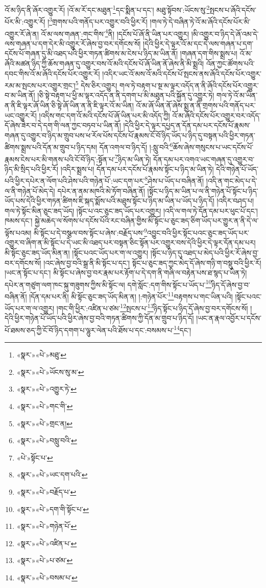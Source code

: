 འོ་མ་ཉིད་ནི་ཞོར་འགྱུར་རོ། །འོ་མ་རོ་དང་མཐུན་\footnote{«སྣར་»«པེ་»མཐུ་}དང་སྨིན་པ་དང་། མཐུ་སྟོབས་:ཡོངས་སུ་\footnote{«སྣར་»«པེ་»ཡོངས་སུ་མ་}སྤངས་པ་ཞོའི་དངོས་པོར་མི་:འགྱུར་རོ། །\footnote{«སྣར་»«པེ་»འགྱུར་ཏེ་}གྲགས་པའི་གནོད་པར་འགྱུར་བའི་ཕྱིར་རོ། །གལ་ཏེ་དེ་བཞིན་ཏེ་འོ་མ་ཞོའི་དངོས་པོར་མི་འགྱུར་རོ་ཞེ་ན། འོ་མ་ལས་གཞན་:གང་གིས་\footnote{«སྣར་»«པེ་»གང་གི་}ནི། །དངོས་པོ་ཞོ་ནི་ཡིན་པར་འགྱུར། །མི་འགྱུར་བ་ཉིད་དེ་ཞོ་འམ་དེ་ལས་གཞན་པ་དག་དེར་མི་འགྱུར་རོ་ཞེས་བྱ་བར་དགོངས་སོ། །དེའི་ཕྱིར་དེ་ལྟར་འོ་མ་དང་དེ་ལས་གཞན་པ་དག་དངོས་པོ་གཞན་དུ་མི་འཐད་པའི་ཕྱིར་གཏན་ཚིགས་མ་ངེས་པ་ཉིད་མ་ཡིན་ནོ། །གཞན་དག་གིས་སྨྲས་པ། འོ་མ་ཞོའི་མཚན་ཉིད་ཀྱི་ཆོས་གཞན་དུ་འགྱུར་བས་འོ་མའི་དངོས་པོ་ཞོ་ཡིན་ནོ་ཞེས་ནི་མི་སྨྲའི། འོན་ཀྱང་ཚོགས་པའི་དབང་གིས་འོ་མ་ཞོའི་དངོས་པོར་འགྱུར་རོ། །འདིར་ཡང་འོ་མས་འོ་མའི་དངོས་པོ་སྤངས་ནས་ཞོའི་དངོས་པོར་འགྱུར་རམ་མ་སྤངས་པར་འགྱུར་གྲང་།\footnote{«སྣར་»«པེ་»གྲང་ན།} དེས་ཅིར་འགྱུར། གལ་ཏེ་བརྟག་པ་སྔ་མ་ལྟར་འདོད་ན་ནི་ཞོའི་དངོས་པོར་འགྱུར་བ་མ་ཡིན་ནོ། །ཅི་སྟེ་བརྟག་པ་ཕྱི་མ་ལྟར་འདོད་ན་ནི་དགག་པ་མི་མཐུན་པའི་སྐྱོན་དུ་འགྱུར་ཏེ། གལ་ཏེ་འོ་མ་ཡིན་ན་ནི་ཇི་ལྟར་ཞོ་ཡིན་ཅི་སྟེ་ཞོ་ཡིན་ན་ནི་ཇི་ལྟར་འོ་མ་ཡིན། འོ་མ་ཞོ་ཡིན་ནོ་ཞེས་སྨྲ་ན་ནི་གྲགས་པའི་གནོད་པར་ཡང་འགྱུར་རོ། །འདིས་གང་དག་འོ་མའི་དངོས་པོ་ཞོ་ཡིན་པར་མི་འདོད་ཀྱི། འོ་མ་ཞོའི་དངོས་པོར་འགྱུར་བར་འདོད་དོ་ཞེས་ཟེར་བ་དེ་དག་གི་ལན་ཀྱང་བཏབ་པ་ཡིན་ནོ། །དེའི་ཕྱིར་དེ་ལྟར་དཔྱད་ན་དོན་དམ་པར་དངོས་པོ་རྣམས་གཞན་དུ་འགྱུར་བ་ཉིད་མ་གྲུབ་པས་ཕ་རོལ་པོས་དངོས་པོ་རྣམས་ངོ་བོ་ཉིད་ཡོད་པ་ཉིད་དུ་བསྟན་པའི་ཕྱིར་གཏན་ཚིགས་སྨྲས་པའི་དོན་མ་གྲུབ་པ་ཉིད་དམ། དོན་འགལ་བ་ཉིད་དོ། །:སླུ་བའི་\footnote{«སྣར་»«པེ་»བསླུ་བའི་}ཆོས་ཞེས་གསུངས་པ་ཡང་དངོས་པོ་རྣམས་ངེས་པར་མི་གནས་པའི་ངོ་བོ་ཉིད་:སྟོན་པ་\footnote{«པེ་»སྟོང་པ་}ཉིད་མ་ཡིན་ཏེ། དོན་དམ་པར་འགའ་ཡང་གཞན་དུ་འགྱུར་བ་ཉིད་མི་སྲིད་པའི་ཕྱིར་རོ། །འདིར་སྨྲས་པ། དོན་དམ་པར་དངོས་པོ་རྣམས་སྟོང་པ་ཉིད་མ་ཡིན་ཏེ། དེའི་གཉེན་པོ་ཡོད་པའི་ཕྱིར་དཔེར་ན་ལོག་པའི་ཤེས་པའི་གཉེན་པོ་:ཡང་དག་པར་\footnote{«སྣར་»«པེ་»ཡང་དག་པའི་}ཤེས་པ་ཡོད་པ་བཞིན་ནོ། །འདི་ན་གང་མེད་པ་དེ་ལ་ནི་གཉེན་པོ་མེད་དེ། དཔེར་ན་ནམ་མཁའི་མེ་ཏོག་བཞིན་ནོ། །སྟོང་པ་ཉིད་མ་ཡིན་པ་ལ་ནི་གཉེན་པོ་སྟོང་པ་ཉིད་ཡོད་པས་དེའི་ཕྱིར་གཏན་ཚིགས་ཇི་སྐད་སྨོས་པའི་མཐུས་སྟོང་པ་ཉིད་མ་ཡིན་པ་ཡོད་པ་ཉིད་དོ། །འདིར་བཤད་པ། གལ་ཏེ་སྟོང་མིན་ཅུང་ཟད་ཡོད། །སྟོང་པ་འང་ཅུང་ཟད་ཡོད་པར་འགྱུར། །འདི་ལ་གལ་ཏེ་དོན་དམ་པར་ཕུང་པོ་དང་། ཁམས་དང་། སྐྱེ་མཆེད་ལ་སོགས་པ་དངོས་པོའི་རང་བཞིན་གྱིས་མི་སྟོང་པ་ཅུང་ཟད་ཅིག་ཡོད་པར་གྱུར་ན་ནི་དེ་ལ་ལྟོས་པའམ། མི་སྟོང་པ་དེ་བསྩལ་བས་སྟོང་པ་ཞེས་:བརྗོད་པས་\footnote{«སྣར་»«པེ་»བརྗོད་པ་}འབྱུང་བའི་ཕྱིར་སྟོང་པའང་ཅུང་ཟད་ཡོད་པར་འགྱུར་བ་ཞིག་ན་མི་སྟོང་པ་དེ་ཡང་མི་འཐད་པར་བསྟན་ཅིང་སྟོན་པར་འགྱུར་བས་དེའི་ཕྱིར་དེ་ལྟར་དོན་དམ་པར། མི་སྟོང་ཅུང་ཟད་ཡོད་མིན་ན། །སྟོང་པའང་ཡོད་པར་ག་ལ་འགྱུར། །སྟོང་པ་ཉིད་དུ་འཐད་པ་མེད་པའི་ཕྱིར་རོ་ཞེས་བྱ་བར་དགོངས་སོ། །འང་ཞེས་བྱ་བའི་སྒྲ་ནི་མི་སྟོང་པ་དང་། སྟོང་པ་ཅུང་ཟད་ཀྱང་མེད་དོ་ཞེས་གཉི་ག་བསྡུ་བའི་ཕྱིར་རོ། །ཡང་ན་སྟོང་པ་དང་། མི་སྟོང་པ་ཞེས་བྱ་བར་རྣམ་པར་རྟོག་པ་དེ་དག་ནི་གཞི་ལ་བརྟེན་པས་ཐ་སྙད་པ་ཡིན་ཏེ། དཔེར་ན་གཙུག་ལག་ཁང་སྐུ་གཟུགས་ཀྱིས་མི་སྟོང་ལ། དགེ་སློང་:དག་གིས་སྟོང་པ་ཡོད་པ་\footnote{«སྣར་»«པེ་»དག་གི་སྟོང་པ་}ཉིད་དོ་ཞེས་བྱ་བ་བཞིན་ནོ། །དོན་དམ་པར་ནི། མི་སྟོང་ཅུང་ཟད་ཡོད་མིན་ན། །:གཉེན་པོར་\footnote{«སྣར་»«པེ་»གཉེན་པོ་}བརྟགས་པ་གང་ཡིན་པའི། །སྟོང་པའང་ཡོད་པར་ག་ལ་འགྱུར། །གང་གི་ཕྱིར་:འཛིན་པ་ཙམ་\footnote{«སྣར་»«པེ་»འཛིན་པ་}སྤངས་པ་\footnote{«སྣར་»«པེ་»པ་ཙམ་}ཉིད་སྟོང་པ་ཉིད་དོ་ཞེས་བྱ་བར་དགོངས་སོ། །དེའི་ཕྱིར་གཉེན་པོ་ཡོད་པའི་ཕྱིར་ཞེས་བྱ་བའི་གཏན་ཚིགས་ཀྱི་དོན་མ་གྲུབ་པ་ཉིད་དོ། །ཡང་ན་རྣལ་འབྱོར་པ་དངོས་པོ་ཐམས་ཅད་ཀྱི་ངོ་བོ་ཉིད་དགག་པ་ལྷུར་ལེན་པའི་ཐོས་པ་དང་:བསམས་པ་\footnote{«སྣར་»«པེ་»བསམ་པ་}དང་། 